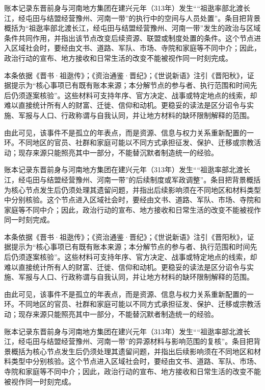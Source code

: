 账本记录东晋前身与河南地方集团在建兴元年（313年）发生““祖逖率部北渡长江，经屯田与结盟经营豫州、河南一带”的执行中的空间与人员处置”。条目把背景概括为“祖逖率部北渡长江，经屯田与结盟经营豫州、河南一带”发生的政治与区域条件共同作用，并指出该节点改变后续资源、联盟或制度处置的条件。这个节点进入区域社会时，要经由文书、道路、军队、市场、寺院和家庭等不同中介；因此，政治行动的宣布、地方接收和日常生活的改变不能被视作同一时刻完成。

本条依据《晋书·祖逖传》；《资治通鉴·晋纪》；《世说新语》注引《晋阳秋》，证据提示为“核心事项已有既有账本来源；本分解节点的参与者、执行范围和时间先后仍须逐案核验”。这些材料可支持年序、官方决定、战事或特定地点的线索，却难以直接统计所有人的财富、迁徙、信仰和动机。更稳妥的读法是区分诏令与实施、军报与人口、行政称谓与自我认同，并让地方材料的缺环限制解释的范围。

由此可见，该事件不是孤立的年表点，而是资源、信息与权力关系重新配置的一环。不同地区的官员、社群和家庭可能以不同方式承担征发、保护、迁移或宗教活动；现存来源只能照亮其中一部分，不能替沉默者制造统一的经验。

账本记录东晋前身与河南地方集团在建兴元年（313年）发生““祖逖率部北渡长江，经屯田与结盟经营豫州、河南一带”的后续制度或军政调整”。条目把背景概括为核心节点发生后仍须处理其遗留问题，并指出后续影响须在不同地区和材料类型中分别核验。这个节点进入区域社会时，要经由文书、道路、军队、市场、寺院和家庭等不同中介；因此，政治行动的宣布、地方接收和日常生活的改变不能被视作同一时刻完成。

本条依据《晋书·祖逖传》；《资治通鉴·晋纪》；《世说新语》注引《晋阳秋》，证据提示为“核心事项已有既有账本来源；本分解节点的参与者、执行范围和时间先后仍须逐案核验”。这些材料可支持年序、官方决定、战事或特定地点的线索，却难以直接统计所有人的财富、迁徙、信仰和动机。更稳妥的读法是区分诏令与实施、军报与人口、行政称谓与自我认同，并让地方材料的缺环限制解释的范围。

由此可见，该事件不是孤立的年表点，而是资源、信息与权力关系重新配置的一环。不同地区的官员、社群和家庭可能以不同方式承担征发、保护、迁移或宗教活动；现存来源只能照亮其中一部分，不能替沉默者制造统一的经验。

账本记录东晋前身与河南地方集团在建兴元年（313年）发生““祖逖率部北渡长江，经屯田与结盟经营豫州、河南一带”的异源材料与影响范围的复核”。条目把背景概括为核心节点发生后仍须处理其遗留问题，并指出后续影响须在不同地区和材料类型中分别核验。这个节点进入区域社会时，要经由文书、道路、军队、市场、寺院和家庭等不同中介；因此，政治行动的宣布、地方接收和日常生活的改变不能被视作同一时刻完成。

